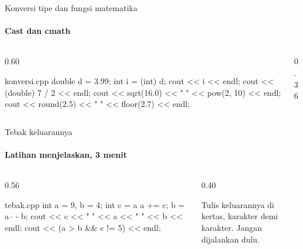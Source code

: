 \documentclass[t]{beamer}
\begin{document}
\begin{frame}[fragile]{Konversi tipe dan fungsi matematika}
\framesubtitle{Cast dan cmath}
\begin{columns}[T]
\begin{column}{0.60\textwidth}
\begin{Kode}[listing options={style=ITERACodeKecil}]{konversi.cpp}
double d = 3.99;
int i = (int) d;
cout << i << endl;
cout << (double) 7 / 2 << endl;
cout << sqrt(16.0) << " " << pow(2, 10) << endl;
cout << round(2.5) << " " << floor(2.7) << endl;
\end{Kode}
\end{column}
\begin{column}{0.36\textwidth}
\end{column}
\end{columns}
\end{frame}

\begin{frame}[fragile]{Tebak keluarannya}
\framesubtitle{Latihan menjelaskan, 3 menit}
\begin{columns}[T]
\begin{column}{0.56\textwidth}
\begin{Kode}[]{tebak.cpp}
int a = 9, b = 4;
int c = a %
a += c;
b = a-- - b;
cout << c << " " << a << " " << b << endl;
cout << (a > b && c != 5) << endl;
\end{Kode}
\end{column}
\begin{column}{0.40\textwidth}
\begin{Catatan}
Tulis keluarannya di kertas, karakter demi karakter. Jangan dijalankan dulu.
\end{Catatan}
\end{column}
\end{columns}
\end{frame}
\end{document}
